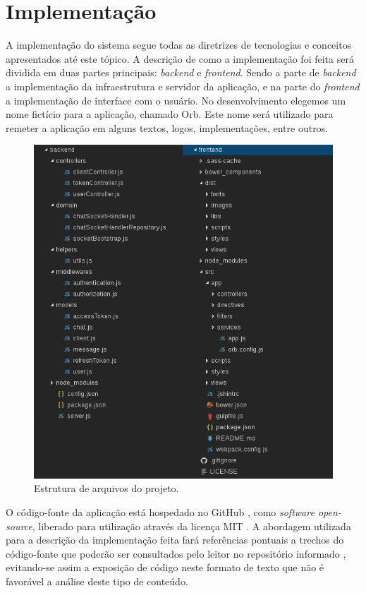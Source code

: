 \chapter{Implementação}
A implementação do sistema segue todas as diretrizes de tecnologias e conceitos apresentados até este tópico. A descrição de como a implementação foi feita será dividida em duas partes principais: \textit{backend} e \textit{frontend}. Sendo a parte de \textit{backend} a implementação da infraestrutura e servidor da aplicação, e na parte do \textit{frontend} a implementação de interface com o usuário. No desenvolvimento elegemos um nome fictício para a aplicação, chamado Orb. Este nome será utilizado para remeter a aplicação em alguns textos, logos, implementações, entre outros.

\begin{figure}[!h]
	\centering
	\includegraphics[scale=0.75]{imagens/estrutura_arquivos.png}
	\caption{\small Estrutura de arquivos do projeto.}
	\label{fig:estrutura-arquivos}
\end{figure}

O código-fonte da aplicação está hospedado no GitHub \cite{orb}, como \textit{software open-source}, liberado para utilização através da licença MIT \cite{mit}. A abordagem utilizada para a descrição da implementação feita fará referências pontuais a trechos do código-fonte que poderão ser consultados pelo leitor no repositório informado \cite{orb}, evitando-se assim a exposição de código neste formato de texto que não é favorável a análise deste tipo de conteúdo.

